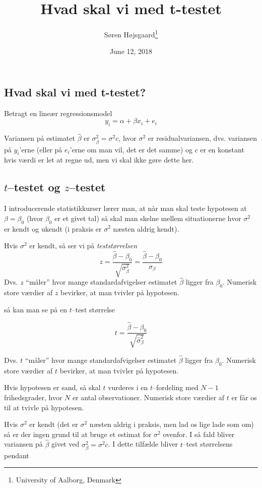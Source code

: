 \documentclass[]{article}
\title{Hvad skal vi med t-testet}
\author{Søren Højsgaard\footnote{University of Aalborg, Denmark}}
\date{June 12, 2018}
\begin{document}
\maketitle

{
\setcounter{tocdepth}{3}
\tableofcontents
}
\subsection{Hvad skal vi med t-testet?}\label{hvad-skal-vi-med-t-testet}

Betragt en lineær regressionsmodel \[
 y_i = \alpha + \beta x_i + e_i
\]

Variansen på estimatet \(\hat\beta\) er \(\sigma^2_\beta=\sigma^2 c\),
hvor \(\sigma^2\) er residualvariansen, dvs. variansen på \(y_i\)'erne
(eller på \(e_i\)'erne om man vil, det er det samme) og \(c\) er en
konstant hvis værdi er let at regne ud, men vi skal ikke gøre dette her.

\subsection{\texorpdfstring{\(t\)--testet og
\(z\)--testet}{t--testet og z--testet}}\label{ttestet-og-ztestet}

I introducerende statistikkurser lærer man, at når man skal teste
hypotesen at \(\beta=\beta_0\) (hvor \(\beta_0\) er et givet tal) så
skal man skelne mellem situationerne hvor \(\sigma^2\) er kendt og
ukendt (i praksis er \(\sigma^2\) næsten aldrig kendt).

Hvis \(\sigma^2\) er kendt, så ser vi på \emph{teststørrelsen} \[
 z = \frac{\hat\beta-\beta_0}{\sqrt{\sigma^2_\beta}} = \frac{\hat\beta-\beta_0}{\sigma_\beta}
\] Dvs. \(z\) ``måler'' hvor mange standardafvigelser estimatet
\(\hat\beta\) ligger fra \(\beta_0\). Numerisk store værdier af \(z\)
bevirker, at man tvivler på hypotesen.

så kan man se på en \(t\)--test størrelse

\[
t = \frac{\hat\beta-\beta_0}{\sqrt{\hat\sigma^2_\beta}}
\]

Dvs. \(t\) ``måler'' hvor mange standardafvigelser estimatet
\(\hat\beta\) ligger fra \(\beta_0\). Numerisk store værdier af \(t\)
bevirker, at man tvivler på hypotesen.

Hvis hypotesen er sand, så skal \(t\) vurderes i en \(t\)--fordeling med
\(N-1\) frihedsgrader, hvor \(N\) er antal observationer. Numerisk store
værdier af \(t\) er får os til at tvivle på hypotesen.

Hvis \(\sigma^2\) er kendt (det er \(\sigma^2\) næsten aldrig i praksis,
men lad os lige lade som om) så er der ingen grund til at bruge et
estimat for \(\sigma^2\) ovenfor. I så fald bliver variansen på
\(\hat\beta\) givet ved \(\sigma^2_\beta=\sigma^2 c\). I dette tilfælde
bliver \(t\)--test størrelsens pendant
\end{document}

